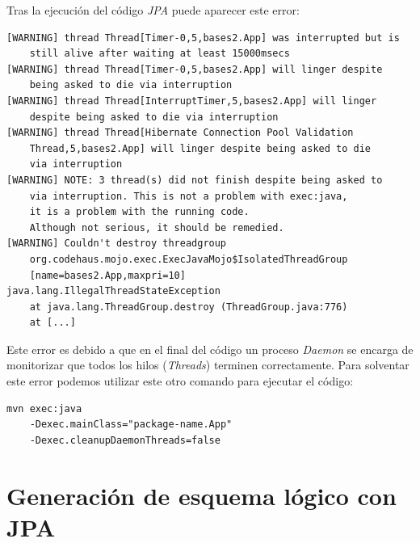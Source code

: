 \documentclass[11pt,a4paper]{article}
\begin{document}
Tras la ejecución del código \emph{JPA} puede aparecer este error:

\begin{lstlisting}
[WARNING] thread Thread[Timer-0,5,bases2.App] was interrupted but is 
	still alive after waiting at least 15000msecs
[WARNING] thread Thread[Timer-0,5,bases2.App] will linger despite 
	being asked to die via interruption
[WARNING] thread Thread[InterruptTimer,5,bases2.App] will linger 
	despite being asked to die via interruption
[WARNING] thread Thread[Hibernate Connection Pool Validation 
	Thread,5,bases2.App] will linger despite being asked to die 
	via interruption
[WARNING] NOTE: 3 thread(s) did not finish despite being asked to 
	via interruption. This is not a problem with exec:java, 
	it is a problem with the running code. 
	Although not serious, it should be remedied.
[WARNING] Couldn't destroy threadgroup 
	org.codehaus.mojo.exec.ExecJavaMojo$IsolatedThreadGroup
	[name=bases2.App,maxpri=10]
java.lang.IllegalThreadStateException
    at java.lang.ThreadGroup.destroy (ThreadGroup.java:776)
    at [...]
\end{lstlisting}

Este error es debido a que en el final del código un proceso \emph{Daemon} se encarga de monitorizar que todos los hilos (\emph{Threads}) terminen correctamente. Para solventar este error podemos utilizar este otro comando para ejecutar el código:

\begin{lstlisting}
mvn exec:java 
	-Dexec.mainClass="package-name.App" 
	-Dexec.cleanupDaemonThreads=false
\end{lstlisting}


\newpage
\section{Generación de esquema lógico con JPA}
\end{document}
